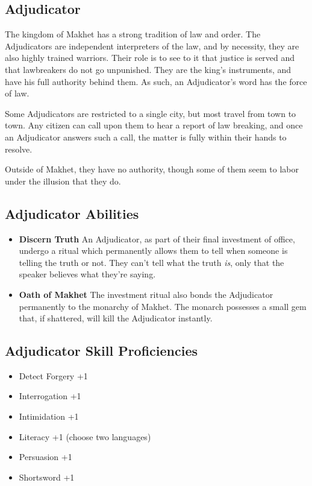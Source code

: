 \begin{multicols}{2}
\section{Adjudicator}

The kingdom of Makhet has a strong tradition of law and order. The 
Adjudicators are independent interpreters of the law, and by necessity, 
they are also highly trained warriors. Their role is to see to it that 
justice is served and that lawbreakers do not go unpunished. They are 
the king's instruments, and have his full authority behind them. As
such, an Adjudicator's word has the force of law.

Some Adjudicators are restricted to a single city, but most travel from 
town to town. Any citizen can call upon them to hear a report of law 
breaking, and once an Adjudicator answers such a call, the matter is 
fully within their hands to resolve.

Outside of Makhet, they have no authority, though some of them seem to 
labor under the illusion that they do.

\subsection{Adjudicator Abilities}

\begin{itemize}
    \item \textbf{Discern Truth} An Adjudicator, as part of their final 
    investment of office, undergo a ritual which permanently allows them 
    to tell when someone is telling the truth or not. They can't tell 
    what the truth \textit{is}, only that the speaker believes what 
    they're saying.
    \item \textbf{Oath of Makhet} The investment ritual also bonds the 
    Adjudicator permanently to the monarchy of Makhet. The monarch
    possesses a small gem that, if shattered, will kill the Adjudicator 
    instantly.
\end{itemize}

\subsection{Adjudicator Skill Proficiencies}

\begin{itemize}
    \item Detect Forgery +1
    \item Interrogation +1
    \item Intimidation +1
    \item Literacy +1 (choose two languages)
    \item Persuasion +1
    \item Shortsword +1
\end{itemize}


\end{multicols}
